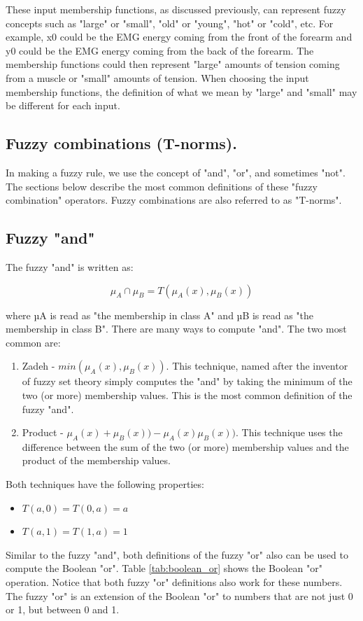 These input membership functions, as discussed previously, can represent fuzzy concepts 
such as "large" or "small", "old" or "young", "hot" or "cold", etc. For example, x0
could be the EMG energy coming from the front of the forearm and y0 could be the
EMG energy coming from the back of the forearm. The membership functions could
then represent "large" amounts of tension coming from a muscle or "small"
amounts of tension. When choosing the input membership functions, the definition
of what we mean by "large" and "small" may be different for each input.

\subsection{Fuzzy combinations (T-norms).} 
In making a fuzzy rule, we use the concept of "and", "or", and sometimes "not". 
The sections below describe the most common definitions of these 
"fuzzy combination" operators. Fuzzy combinations are also referred to as "T-norms".

\subsection{Fuzzy "and"}

The fuzzy "and" is written as: 

\begin{equation}\label{eq:prediction}
\displaystyle \mu_A\cap \mu_B = T(\mu_A(x),\mu_ B(x))  
\end{equation}

where µA is read as "the membership in class A" and µB is read as "the
membership in class B". There are many ways to compute "and". The two most
common are: 

\begin{enumerate}
\item Zadeh - $min(\mu_A(x), \mu_B(x))$.  This technique, named after the
inventor of fuzzy set theory simply computes the "and" by taking the minimum of
the two (or more) membership values. This is the most common definition of the
fuzzy "and". 
\item Product - $\mu_A(x) + \mu_B(x)) - \mu_A(x) \mu_B(x))$.  This technique uses the
difference between the sum of the two (or more) membership values and the
product of the membership values.
\end{enumerate}

Both techniques have the following properties:
\begin{itemize}
\item $T(a,0) = T(0,a) = a$ 
\item $T(a,1) = T(1,a) = 1$
\end{itemize} 
Similar to the fuzzy "and", both
definitions of the fuzzy "or" also can be used to compute the Boolean "or".
Table \ref{tab:boolean_or} shows the Boolean "or" operation. Notice that both fuzzy "or" definitions
also work for these numbers. The fuzzy "or" is an extension of the Boolean "or"
to numbers that are not just 0 or 1, but between 0 and 1.


